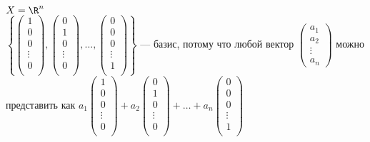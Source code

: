 $X = \R^n$\\
$\left\{
\begin{pmatrix}
1\\
0\\
0\\
\vdots \\
0\\
\end{pmatrix},
\begin{pmatrix}
0\\
1\\
0\\
\vdots \\
0\\
\end{pmatrix},
\dots,
\begin{pmatrix}
0\\
0\\
0\\
\vdots \\
1\\
\end{pmatrix}
\right\}$ --- базис, потому что любой вектор 
$\begin{pmatrix}
	a_1\\
	a_2\\
	\vdots \\
	a_n 
\end{pmatrix}$ можно представить как
$a_1
\begin{pmatrix}
1\\
0\\
0\\
\vdots \\
0\\
\end{pmatrix}
+a_2
\begin{pmatrix}
0\\
1\\
0\\
\vdots \\
0\\
\end{pmatrix}
+\dots+a_n
\begin{pmatrix}
0\\
0\\
0\\
\vdots \\
1\\
\end{pmatrix}$\\
